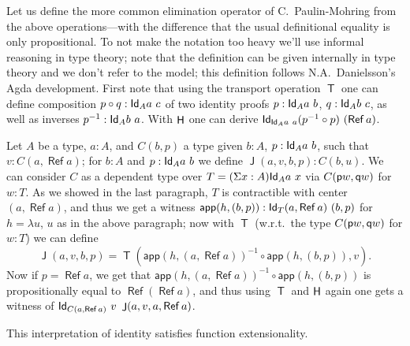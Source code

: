\documentclass[10pt,a4paper]{article}
\DeclareMathOperator{\Ref}{\mathsf{Ref}}
\DeclareMathOperator{\Transp}{\mathsf{T}}
\DeclareMathOperator{\HH}{{\sf H}}
\DeclareMathOperator{\Jel}{\mathsf{J}}
\newcommand{\Id}{{\sf Id}}
\newcommand{\app}{\mathsf{app}}
\newcommand{\pp}{{\sf p}}
\newcommand{\qq}{{\sf q}}
\begin{document}
Let us define the more common elimination operator of C.\
Paulin-Mohring from the above operations---with the difference that
the usual definitional equality is only propositional.  To not make the
notation too heavy we'll use informal reasoning in type theory; note
that the definition can be given internally in type theory and we
don't refer to the model; this definition follows N.A.\ Danielsson's
Agda development.  First note that using the transport operation
$\Transp$ one can define composition $p \circ q : \Id_A a~c$ of two
identity proofs $p : \Id_A a~b$, $q : \Id_A b~c$, as well as inverses
$p^{-1} : \Id_A b~a$.  With $\HH$ one can derive $\Id_{\Id_A a~a}
(p^{-1} \circ p)~(\Ref a)$.

Let $A$ be a type, $a : A$, and $C (b,p)$ a type given $b : A$, $p :
\Id_A a~b$, such that $v : C (a, \Ref a)$; for $b : A$ and $p :
\Id_{A} a~b$ we define $\Jel (a,v,b,p) : C (b,u)$.  We can consider
$C$ as a dependent type over $T = (\Sigma x : A) \Id_A a~x$ via $C
(\pp w, \qq w)$ for $w : T$.  As we showed in the last paragraph, $T$
is contractible with center $(a, \Ref a)$, and thus we get a witness
$\app (h, (b,p)) : \Id_T (a,\Ref a)~(b,p)$ for $h = \lambda u$, $u$ as
in the above paragraph; now with $\Transp$ (w.r.t.\ the type $C (\pp
w, \qq w)$ for $w : T$) we can define
\[
\Jel (a,v,b,p) = \Transp (\app (h, (a,\Ref a))^{-1} \circ \app (h,(b,p)), v).
\]
Now if $p = \Ref a$, we get that $\app (h, (a,\Ref a))^{-1} \circ \app
(h,(b,p))$ is propositionally equal to $\Ref (\Ref a)$, and thus using
$\Transp$ and $\HH$ again one gets a witness of
$\Id_{C (a, \Ref a)}~ v~\Jel (a,v,a,\Ref a)$.


\medskip

This interpretation of identity satisfies function extensionality.
\end{document}
